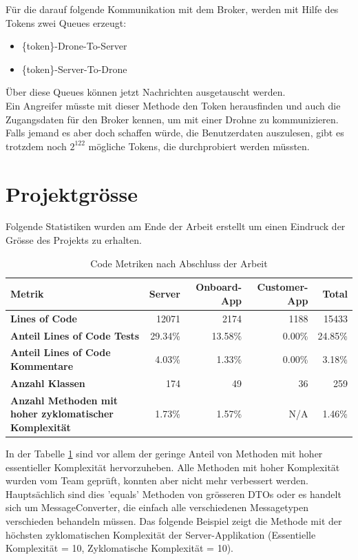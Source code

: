Für die darauf folgende Kommunikation mit dem Broker, werden mit Hilfe des Tokens zwei Queues erzeugt: 
\begin{itemize}
	\item \{token\}-Drone-To-Server
	\item \{token\}-Server-To-Drone
\end{itemize}

Über diese Queues können jetzt Nachrichten ausgetauscht werden. \\

Ein Angreifer müsste mit dieser Methode den Token herausfinden und auch die Zugangsdaten für den Broker kennen, um mit einer Drohne zu kommunizieren. Falls jemand es aber doch schaffen würde, die Benutzerdaten auszulesen, gibt es trotzdem noch $2^{122}$ mögliche Tokens, die durchprobiert werden müssten. \\

\section{Projektgrösse}

Folgende Statistiken wurden am Ende der Arbeit erstellt um einen Eindruck der Grösse des Projekts zu erhalten.\\
\begin{table}[H]
	\begin{tabularx}{\textwidth}{|X|r|r|r|r|}
		\hline
		\textbf{Metrik} & \textbf{Server} & \textbf{Onboard-App} & 
		\textbf{Customer-App} & \textbf{Total} \\
		\hline
		\hline
		\textbf{Lines of Code} & 12071 & 2174 & 1188 & 15433 \\
		\hline
		\textbf{Anteil Lines of Code Tests} & 29.34\% & 13.58\% & 0.00\% & 24.85\% \\
		\hline
		\textbf{Anteil Lines of Code Kommentare} & 4.03\% & 1.33\% & 0.00\% & 3.18\% \\
		\hline
		\textbf{Anzahl Klassen} & 174 & 49 & 36 & 259 \\
		\hline
		\textbf{Anzahl Methoden mit hoher \mbox{zyklomatischer} Komplexität} & 1.73\% & 1.57\% & N/A & 1.46\% \\
		\hline
	\end{tabularx}
	\caption{Code Metriken nach Abschluss der Arbeit}
	\label{table:code-metrics}
\end{table}

In der Tabelle \ref{table:code-metrics} sind vor allem der geringe Anteil von Methoden mit hoher essentieller Komplexität\cite[]{MCCABE} hervorzuheben. Alle Methoden mit hoher Komplexität wurden vom Team geprüft, konnten aber nicht mehr verbessert werden. Hauptsächlich sind dies 'equals' Methoden von grösseren \Gls{DTO}s oder es handelt sich um MessageConverter, die einfach alle verschiedenen Messagetypen verschieden behandeln müssen. Das folgende Beispiel zeigt die Methode mit der höchsten zyklomatischen Komplexität der Server-Applikation (Essentielle Komplexität = 10, Zyklomatische Komplexität = 10). \\


